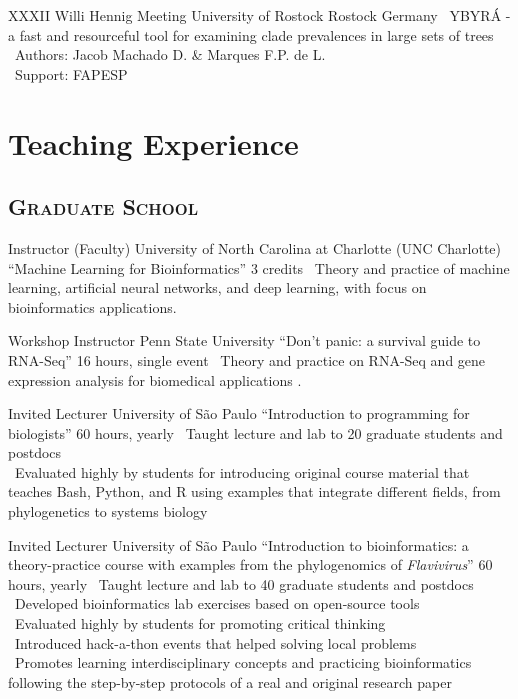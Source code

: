 \documentclass[11pt, letterpaper, sans]{moderncv}
\begin{document}
\vspace{.5em}

	{XXXII Willi Hennig Meeting}
	{University of Rostock}
	{Rostock}
	{Germany}
	{
		\textbullet~YBYRÁ - a fast and resourceful tool for examining clade prevalences in large sets of trees\\
		\textbullet~Authors: Jacob Machado D. \& Marques F.P. de L.\\
		\textbullet~Support: FAPESP
}

\section{Teaching Experience}

\vspace{.5em}
	\subsection{\textsc{Graduate School}}
\vspace{.5em}

	{Instructor (Faculty)}
	{University of North Carolina at Charlotte (UNC Charlotte)}
	{``Machine Learning for Bioinformatics''}
	{3 credits}
	{
		\textbullet~Theory and practice of machine learning, artificial neural networks, and deep learning, with focus on bioinformatics applications.
	}

	{Workshop Instructor}
	{Penn State University}
	{``Don't panic: a survival guide to RNA-Seq''}
	{16 hours, single event}
	{
		\textbullet~Theory and practice on RNA-Seq and gene expression analysis for biomedical applications .
	}

	{Invited Lecturer}
	{University of São Paulo}
	{``Introduction to programming for biologists''}
	{60 hours, yearly}
	{
		\textbullet~Taught lecture and lab to 20 graduate students and postdocs\\
		\textbullet~Evaluated highly by students for introducing original course material that teaches Bash, Python, and R using examples that integrate different fields, from phylogenetics to systems biology
	}

\vspace{.5em}

	{Invited Lecturer}
	{University of São Paulo}
	{``Introduction to bioinformatics: a theory-practice course with examples from the phylogenomics of \emph{Flavivirus}''}
	{60 hours, yearly}
	{
		\textbullet~Taught lecture and lab to 40 graduate students and postdocs\\
		\textbullet~Developed bioinformatics lab exercises based on open-source tools\\
		\textbullet~Evaluated highly by students for promoting critical thinking\\
		\textbullet~Introduced hack-a-thon events that helped solving local problems\\
		\textbullet~Promotes learning interdisciplinary concepts and practicing bioinformatics following the step-by-step protocols of a real and original research paper
	}
\end{document}
